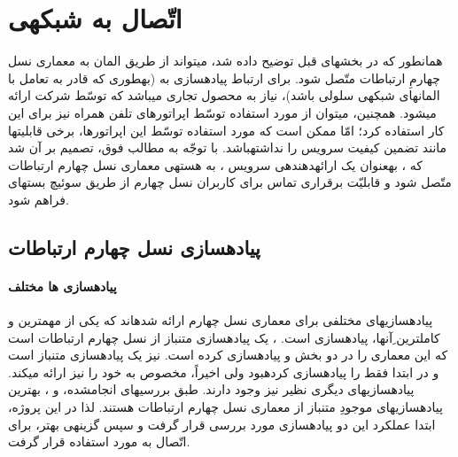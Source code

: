 \chapter{اتّصال  به شبکه\nf ی }
\label{imslte}
همانطور که در بخش\nf های قبل توضیح داده شد،  می\nf تواند از طریق المان  به معماری نسل چهارمِ ارتباطات متّصل شود. برای ارتباط پیاده\nf سازی  به (به\nf طوری که  قادر به تعامل با المان\nf های شبکه\nf ی سلولی باشد)، نیاز به محصول تجاری  می\nf باشد که توسّط شرکت  ارائه می\nf شود. همچنین، می\nf توان از  مورد استفاده توسّط اپراتورهای تلفن همراه نیز برای این کار استفاده کرد؛ امّا ممکن است که  مورد استفاده توسّط این اپراتورها، برخی قابلیت\nf ها مانند تضمین کیفیت سرویس را نداشته\nf باشد. با توجّه به مطالب فوق، تصمیم بر آن شد که ، به\nf عنوان یک ارائه\nf دهنده\nf ی سرویس ، به هسته\nf ی معماری نسل چهارم ارتباطات متّصل شود و قابلیّت برقراری تماس برای کاربران نسل چهارم از طریق سوئیچ بسته\nf ای فراهم شود.

\section{پیاده\nf سازی نسل چهارم ارتباطات}

\subsubsection{پیاده\nf سازی ها مختلف}

پیاده\nf سازی\nf های مختلفی برای معماری نسل چهارم ارائه شده\nf اند که یکی از مهم\nf ترین و کامل\nf ترین ِآن\nf ها، پیاده\nf سازی  است. ، یک پیاده\nf سازی متن\nf باز از نسل چهارم ارتباطات است که این معماری را در دو بخش  و  پیاده\nf سازی کرده است.  نیز یک پیاده\nf سازی متن\nf باز است و در ابتدا فقط  را پیاده\nf سازی کرده\nf بود ولی اخیراً،  مخصوص به خود را نیز ارائه می\nf کند. پیاده\nf سازی\nf های دیگری نظیر  نیز وجود دارند. طبق بررسی\nf های انجام\nf شده،  و ، بهترین پیاده\nf سازی\nf های موجودِ متن\nf باز از معماری نسل چهارم ارتباطات هستند. لذا در این پروژه، ابتدا عملکرد این دو پیاده\nf سازی مورد بررسی قرار گرفت و سپس گزینه\nf ی بهتر، برای اتّصال  به  مورد استفاده قرار گرفت.

